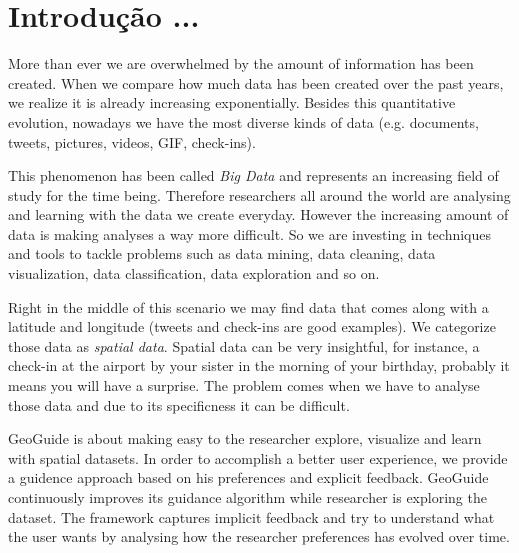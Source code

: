 \chapter{Introdução ...}
\label{chap:introducao}



More than ever we are overwhelmed by the amount of information has been created.
When we compare how much data has been created over the past years, we realize
it is already increasing exponentially.
Besides this quantitative evolution, nowadays
we have the most diverse kinds of data
(e.g. documents, tweets, pictures, videos, GIF, check-ins).

This phenomenon has been called \textit{Big Data} and represents an increasing field of study
for the time being. Therefore researchers all around the world
are analysing and learning with the data we create everyday. 
However the increasing amount of data is making analyses a way more difficult.
So we are investing in techniques and tools to tackle problems such as data mining, data cleaning,
data visualization, data classification, data exploration and so on.

Right in the middle of this scenario we may find data that comes along with a latitude and longitude
(tweets and check-ins are good examples). We categorize those data as \textit{spatial data}.
Spatial data can be very insightful, for instance, a check-in at the airport by your sister
in the morning of your birthday, probably it means you will have a surprise.
The problem comes when we have to analyse those data and due to its specificness it can
be difficult. %

GeoGuide is about making easy to the researcher explore, visualize and learn with spatial datasets.
In order to accomplish a better user experience, we provide a guidence approach based
on his preferences and explicit feedback.
GeoGuide continuously improves its guidance algorithm while
researcher is exploring the dataset. The framework captures implicit feedback
and try to understand what the user wants by analysing how the
researcher preferences has evolved over time.

